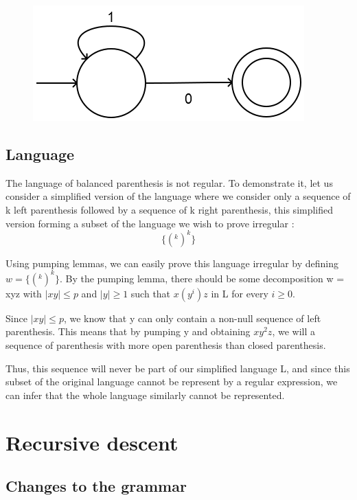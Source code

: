 \documentclass[a4paper, 11pt]{article}
\begin{document}
    	\begin{figure}[!h]
    		\center
    		\includegraphics[scale=0.5]{DFAQ3.png}
    	\end{figure}

    \subsection{Language}
    
    	The language of balanced parenthesis is not regular.
    	To demonstrate it, let us consider a simplified version of the language
    	where we consider only a sequence of k left parenthesis followed by
    	a sequence of k right parenthesis, this simplified version forming
    	a subset of the language we wish to prove irregular :
    	\newline
    	$$\{(^k )^k\}$$

    	Using pumping lemmas, we can easily prove this language irregular by defining
    	$w = \{(^k )^k\}$. By the pumping lemma, there should be some decomposition
    	w = xyz with $|xy| \le p$ and $|y| \ge 1$ such that $x(y^i)z$
    	in L for every $i \ge 0$. \newline

    	Since $|xy| \le p$, we know that y can only contain a non-null sequence of
    	left parenthesis. This means that by pumping y and obtaining $xy^2 z$, we will
    	a sequence of parenthesis with more open parenthesis than closed parenthesis.
    	\newline

    	Thus, this sequence will never be part of our simplified language L, and since
    	this subset of the original language cannot be represent by a regular expression,
    	we can infer that the whole language similarly cannot be represented.
    	
    \section{Recursive descent}
    \subsection{Changes to the grammar}
    
\end{document}

